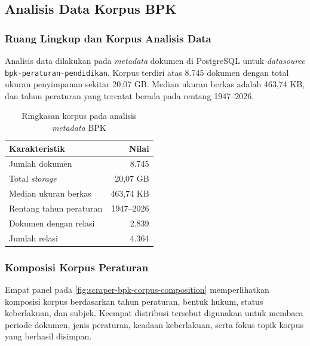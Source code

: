 \subsection{Analisis Data Korpus BPK}
\label{sec:data-mining-korpus-bpk}

\subsubsection{Ruang Lingkup dan Korpus Analisis Data}
\label{sec:ruang-lingkup-data-mining-bpk}

Analisis data dilakukan pada \textit{metadata} dokumen di PostgreSQL untuk \textit{datasource} \texttt{bpk-peraturan-pendidikan}.
Korpus terdiri atas 8.745 dokumen dengan total ukuran penyimpanan sekitar 20,07 GB.
Median ukuran berkas adalah 463,74 KB, dan tahun peraturan yang tercatat berada pada rentang 1947--2026.

\begin{table}[htb]
  \centering
  \footnotesize
    \caption{Ringkasan korpus pada analisis \textit{metadata} BPK}
  \label{tab:ringkasan-korpus-bpk}
  \begin{tabularx}{0.88\textwidth}{@{}>{\raggedright\arraybackslash}X r@{}}
    \toprule
    \textbf{Karakteristik} & \textbf{Nilai} \\
    \midrule
    Jumlah dokumen & 8.745 \\
    Total \textit{storage} & 20,07 GB \\
    Median ukuran berkas & 463,74 KB \\
    Rentang tahun peraturan & 1947--2026 \\
    Dokumen dengan relasi & 2.839 \\
    Jumlah relasi & 4.364 \\
    \bottomrule
  \end{tabularx}
\end{table}

\subsubsection{Komposisi Korpus Peraturan}
\label{sec:komposisi-korpus-bpk}

Empat panel pada \autoref{fig:scraper-bpk-corpus-composition} memperlihatkan komposisi korpus berdasarkan tahun peraturan, bentuk hukum, status keberlakuan, dan subjek.
Keempat distribusi tersebut digunakan untuk membaca periode dokumen, jenis peraturan, keadaan keberlakuan, serta fokus topik korpus yang berhasil disimpan.

